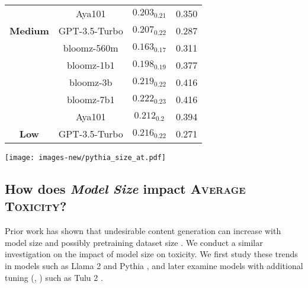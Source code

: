 \begin{minipage}{\textwidth}
\begin{minipage}[b]{0.55\textwidth}
{\begin{tabular}{c|c|c|c}
 & Aya101 & \cellcolor[HTML]{D8A4AC}$0.203_{0.21}$ & \cellcolor[HTML]{CEAAB7}0.350 \\
\multirow{-6}{*}{\textbf{Medium}} & GPT-3.5-Turbo & \cellcolor[HTML]{DBA2A8}$0.207_{0.22}$ & \cellcolor[HTML]{B3BAD3}0.287 \\ \midrule
 & bloomz-560m & \cellcolor[HTML]{B2BAD4}$0.163_{0.17}$ & \cellcolor[HTML]{BDB4C8}0.311 \\
 & bloomz-1b1 & \cellcolor[HTML]{D3A7B1}$0.198_{0.19}$ & \cellcolor[HTML]{D9A3AB}0.377 \\
 & bloomz-3b & \cellcolor[HTML]{E79B9C}$0.219_{0.22}$ & \cellcolor[HTML]{EA9999}0.416 \\
 & bloomz-7b1 & \cellcolor[HTML]{EA9999}$0.222_{0.23}$ & \cellcolor[HTML]{EA9999}0.416 \\
 & Aya101 & \cellcolor[HTML]{E09FA3}$0.212_{0.2}$ & \cellcolor[HTML]{E09FA3}0.394 \\
\multirow{-6}{*}{\textbf{Low}} & GPT-3.5-Turbo & \cellcolor[HTML]{E49D9F}$0.216_{0.22}$ & \cellcolor[HTML]{ACBEDA}0.271 \\ \bottomrule
\end{tabular}%
}
\label{tab:benchmark-lang-res}
    \end{minipage}
    \hfill
\begin{minipage}[b]{0.4\textwidth}
\centering
\texttt{[image: images-new/pythia\_size\_at.pdf]}
\label{fig:pythia}
    \end{minipage}
\end{minipage}

\subsection{\textbf{How does \textit{Model Size} impact \textsc{Average Toxicity}?}}

Prior work has shown that undesirable content generation can increase with model size and possibly pretraining dataset size \citep{10.1145/3442188.3445922, tal-etal-2022-fewer, smith-etal-2022-im,touvron2023llama}. We conduct a similar investigation on the impact of model size on toxicity. We first study these trends in \baseModel models such as Llama 2 \citep{touvron2023llama2} and Pythia \citep{biderman2023pythia}, and later examine models with additional tuning (\instructModel, \prefModel) such as Tulu 2 \citep{ivison2023camels}.

